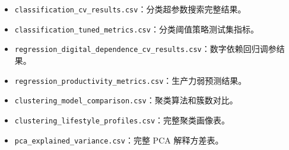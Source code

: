 \begin{itemize}
  \item \texttt{classification\_cv\_results.csv}：分类超参数搜索完整结果。
  \item \texttt{classification\_tuned\_metrics.csv}：分类阈值策略测试集指标。
  \item \texttt{regression\_digital\_dependence\_cv\_results.csv}：数字依赖回归调参结果。
  \item \texttt{regression\_productivity\_metrics.csv}：生产力弱预测结果。
  \item \texttt{clustering\_model\_comparison.csv}：聚类算法和簇数对比。
  \item \texttt{clustering\_lifestyle\_profiles.csv}：完整聚类画像表。
  \item \texttt{pca\_explained\_variance.csv}：完整 PCA 解释方差表。
\end{itemize}
